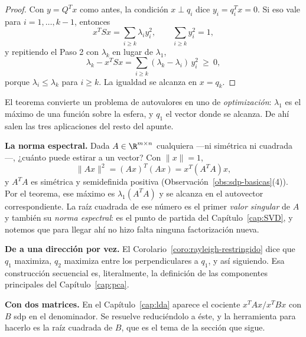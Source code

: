 \begin{proof}
Con $y=Q^Tx$ como antes, la condición $x\perp q_i$ dice $y_i=q_i^Tx=0$. Si eso
vale para $i=1,\dots,k-1$, entonces
\[
x^TSx=\sum_{i\ge k}\lambda_i y_i^2 ,
\qquad \sum_{i\ge k} y_i^2 = 1 ,
\]
y repitiendo el Paso 2 con $\lambda_k$ en lugar de $\lambda_1$,
\[
\lambda_k - x^TSx = \sum_{i\ge k}(\lambda_k-\lambda_i)\,y_i^2\ \ge\ 0 ,
\]
porque $\lambda_i\le\lambda_k$ para $i\ge k$. La igualdad se alcanza en
$x=q_k$.
\end{proof}

\begin{remark}\label{obs:rayleigh-usos}
El teorema convierte un problema de autovalores en uno de \emph{optimización}:
$\lambda_1$ es el máximo de una función sobre la esfera, y $q_1$ el vector
donde se alcanza. De ahí salen las tres aplicaciones del resto del apunte.

\textbf{La norma espectral.} Dada $A\in\R^{m\times n}$ cualquiera ---ni
simétrica ni cuadrada---, ¿cuánto puede estirar a un vector? Con $\|x\|=1$,
\[
\|Ax\|^2=(Ax)^T(Ax)=x^T(A^TA)x ,
\]
y $A^TA$ es simétrica y semidefinida positiva
(Observación~\ref{obs:sdp-basicas}(4)). Por el teorema, ese máximo es
$\lambda_1(A^TA)$ y se alcanza en el autovector correspondiente. La raíz
cuadrada de ese número es el primer \emph{valor singular} de $A$ y también su
\emph{norma espectral}: es el punto de partida del Capítulo~\ref{cap:SVD}, y
notemos que para llegar ahí no hizo falta ninguna factorización nueva.

\textbf{De a una dirección por vez.} El
Corolario~\ref{coro:rayleigh-restringido} dice que $q_1$ maximiza, $q_2$
maximiza entre los perpendiculares a $q_1$, y así siguiendo. Esa construcción
secuencial es, literalmente, la definición de las componentes principales del
Capítulo~\ref{cap:pca}.

\textbf{Con dos matrices.} En el Capítulo~\ref{cap:lda} aparece el cociente
$x^TAx/x^TBx$ con $B$ sdp en el denominador. Se resuelve reduciéndolo a éste,
y la herramienta para hacerlo es la raíz cuadrada de $B$, que es el tema de la
sección que sigue.
\end{remark}

